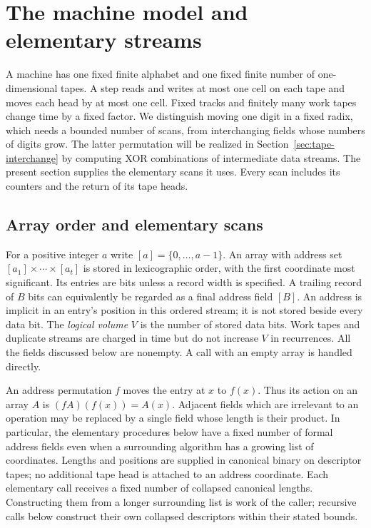 \section{The machine model and elementary streams}
\label{sec:streams}

A machine has one fixed finite alphabet and one fixed finite number of
one-dimensional tapes. A step reads and writes at most one cell on each
tape and moves each head by at most one cell. Fixed tracks and finitely
many work tapes change time by a fixed factor. We distinguish moving one
digit in a fixed radix, which needs a bounded number of scans, from
interchanging fields whose numbers of digits grow. The latter permutation
will be realized in Section~\ref{sec:tape-interchange} by computing XOR
combinations of intermediate data streams. The present section supplies
the elementary scans it uses. Every scan includes its counters and the
return of its tape heads.

\subsection{Array order and elementary scans}

For a positive integer $a$ write $[a]=\{0,\ldots,a-1\}$.
An array with address set $[a_1]\times\cdots\times[a_t]$ is stored in
lexicographic order, with the first coordinate most significant.  Its
entries are bits unless a record width is specified.  A trailing record
of $B$ bits can equivalently be regarded as a final address field $[B]$.
An address is implicit in an entry's position in this ordered stream; it
is not stored beside every data bit.
The \emph{logical volume} $V$ is the number of stored data bits.  Work
tapes and duplicate streams are charged in time but do not increase $V$
in recurrences.  All the fields discussed below are nonempty.  A call
with an empty array is handled directly.

An address permutation $f$ moves the entry at $x$ to $f(x)$.  Thus its
action on an array $A$ is $(fA)(f(x))=A(x)$.  Adjacent fields which are
irrelevant to an operation may be replaced by a single field whose length
is their product.  In particular, the elementary procedures below have a
fixed number of formal address fields even when a surrounding algorithm
has a growing list of coordinates.  Lengths and positions are supplied in
canonical binary on descriptor tapes; no additional tape head is attached to an
address coordinate. Each elementary call receives a fixed number of
collapsed canonical lengths. Constructing them from a longer surrounding
list is work of the caller; recursive calls below construct their own
collapsed descriptors within their stated bounds.

